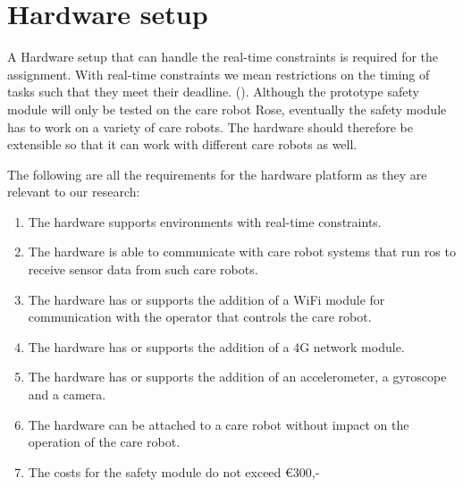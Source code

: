 \documentclass[12pt]{scrreprt}
\begin{document}
\section{Hardware setup}
\label{Hardware setup}

A Hardware setup that can handle the real-time constraints is required for the assignment. With real-time constraints we mean restrictions on the timing of tasks such that they meet their deadline. (\cite{real-time_constraints}). Although the prototype safety module will only be tested on the care robot Rose, eventually the safety module has to work on a variety of care robots. The hardware should therefore be extensible so that it can work with different care robots as well.
\par
The following are all the requirements for the hardware platform as they are relevant to our research:

\begin{enumerate}
    \item The hardware supports environments with real-time constraints. \label{hsOne}
    \item The hardware is able to communicate with care robot systems that run \acrlong{ros} to receive sensor data from such care robots. \label{hsTwo}
    \item The hardware has or supports the addition of a WiFi module for communication with the operator that controls the care robot. \label{hsThree}
    \item The hardware has or supports the addition of a 4G network module. \label{hsFour}
    \item The hardware has or supports the addition of an accelerometer, a gyroscope and a camera. \label{hsFive}
    \item The hardware can be attached to a care robot without impact on the operation of the care robot. \label{hsSix}
    \item The costs for the safety module do not exceed €300,- \label{hsSeven}
\end{enumerate}
\end{document}
